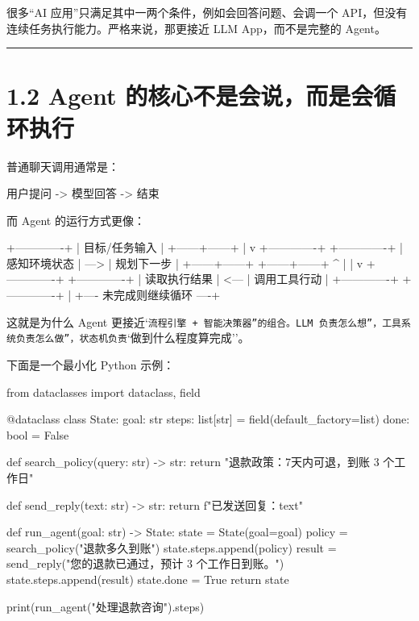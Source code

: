 很多``AI 应用''只满足其中一两个条件，例如会回答问题、会调一个 API，但没有连续任务执行能力。严格来说，那更接近 LLM App，而不是完整的 Agent。


\bigskip\hrule\bigskip

\section{1.2 Agent 的核心不是会说，而是会循环执行}

普通聊天调用通常是：


\begin{codeblock}
用户提问 -> 模型回答 -> 结束
\end{codeblock}

而 Agent 的运行方式更像：


\begin{codeblock}
+-------------+
| 目标/任务输入 |
+------+------+
       |
       v
+-------------+      +-------------+
| 感知环境状态 | ---> | 规划下一步   |
+------+------+      +------+------+
       ^                    |
       |                    v
+-------------+      +-------------+
| 读取执行结果 | <--- | 调用工具行动 |
+-------------+      +-------------+
       |
       +---- 未完成则继续循环 ----+
\end{codeblock}

这就是为什么 Agent 更接近`\texttt{流程引擎 + 智能决策器''的组合。LLM 负责}\texttt{怎么想''，工具系统负责}\texttt{怎么做''，状态机负责}`做到什么程度算完成''。


下面是一个最小化 Python 示例：


\begin{codeblock}
from dataclasses import dataclass, field


@dataclass
class State:
    goal: str
    steps: list[str] = field(default_factory=list)
    done: bool = False


def search_policy(query: str) -> str:
    return "退款政策：7天内可退，到账 3 个工作日"


def send_reply(text: str) -> str:
    return f"已发送回复：{text}"


def run_agent(goal: str) -> State:
    state = State(goal=goal)
    policy = search_policy("退款多久到账")
    state.steps.append(policy)
    result = send_reply("您的退款已通过，预计 3 个工作日到账。")
    state.steps.append(result)
    state.done = True
    return state


print(run_agent("处理退款咨询").steps)
\end{codeblock}

